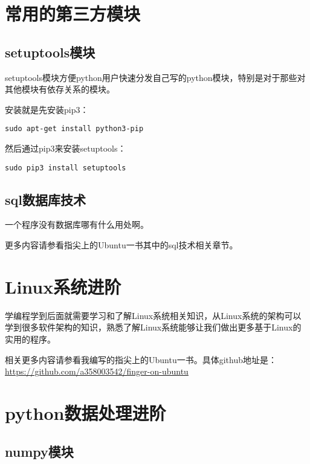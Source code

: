 \documentclass[12pt,oneside]{book}
\begin{document}
\begin{common-format}
\part{常用的第三方模块}
\chapter{setuptools模块}
setuptools模块方便python用户快速分发自己写的python模块，特别是对于那些对其他模块有依存关系的模块。

安装就是先安装pip3：
\begin{Verbatim}
sudo apt-get install python3-pip
\end{Verbatim}


然后通过pip3来安装setuptools：
\begin{Verbatim}
sudo pip3 install setuptools
\end{Verbatim}


\chapter{sql数据库技术}
\begin{flushright}
\begin{notecard}[red!30]{12em}
 一个程序没有数据库哪有什么用处啊。
\end{notecard}
\end{flushright}

更多内容请参看指尖上的Ubuntu一书其中的sql技术相关章节。





\part{Linux系统进阶}
学编程学到后面就需要学习和了解Linux系统相关知识，从Linux系统的架构可以学到很多软件架构的知识，熟悉了解Linux系统能够让我们做出更多基于Linux的实用的程序。

相关更多内容请参看我编写的指尖上的Ubuntu一书。具体github地址是：\\
\href{https://github.com/a358003542/finger-on-ubuntu}{https://github.com/a358003542/finger-on-ubuntu}


\part{python数据处理进阶}

\chapter{numpy模块}

\end{common-format}
\end{document}
